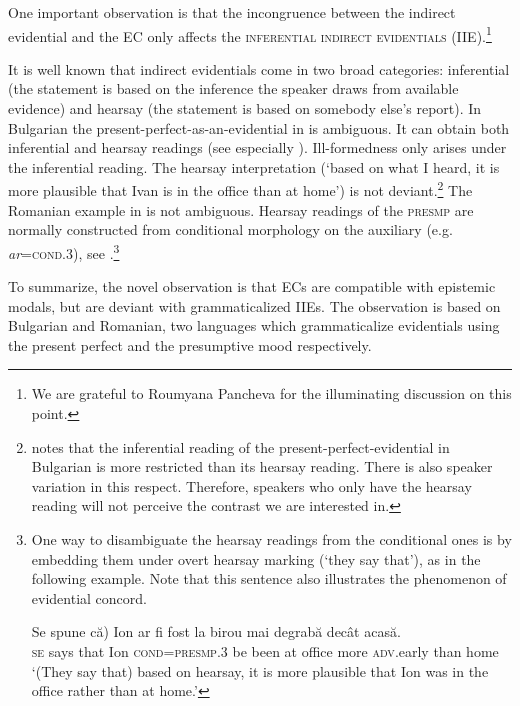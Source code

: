 \documentclass[output=paper,
]{langscibook}
\begin{document}
\noindent One important observation is that the incongruence between  the indirect evidential and the EC only affects the \textsc{inferential indirect evidentials} (IIE).\footnote{We are grateful to Roumyana Pancheva for the illuminating discussion on this point.} 

It is well known that indirect evidentials come in two broad categories: inferential (the statement is based on the inference the speaker draws from available evidence) and hearsay (the statement is based on somebody else's report). In Bulgarian the present-perfect-as-an-evidential in  is ambiguous. It can obtain both inferential and hearsay readings (see especially \citealt{smir13,koev17}). Ill-formedness only arises under the inferential reading. The hearsay interpretation (`based on what I heard, it is more plausible that Ivan is in the office than at home') is not deviant.\footnote{\cite[fn. 2]{koev17} notes that the inferential reading of the present-perfect-evidential in Bulgarian is more restricted than its hearsay reading. There is also speaker variation in this respect. Therefore, speakers who only have the hearsay reading will not perceive the contrast we are interested in.}
The Romanian example in  is not ambiguous. Hearsay readings of the \textsc{presmp} are normally constructed from conditional morphology on the auxiliary (e.g. \textit{ar}=\textsc{cond.3}), see \citet{iri18}.\footnote{One way to disambiguate the hearsay readings from the conditional ones is by embedding them under overt hearsay marking (`they say that'), as in the following example. Note that this sentence also illustrates the phenomenon of evidential concord. 

	\ea \gll \minsp{(} Se spune că) Ion ar fi fost la birou mai degrabă decât acasă.\\
	{} \textsc{se} says that Ion \textsc{cond=presmp.3} be been at office more \textsc{adv}.early	than	home\\
	\glt `(They say that) based on hearsay, it is more plausible that Ion was in the office rather than at home.'\z 
}

 To summarize, the novel observation is that ECs are compatible with epistemic modals, but are deviant with grammaticalized IIEs. The observation is based on Bulgarian and Romanian, two languages which grammaticalize evidentials using the present perfect and the presumptive mood respectively. 
\end{document}
